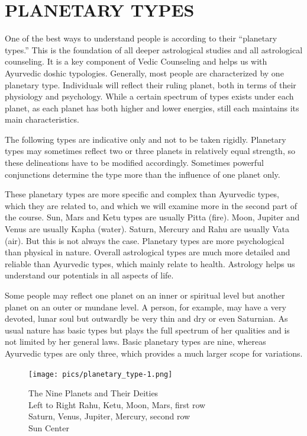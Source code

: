 \section{PLANETARY TYPES}
 

One of the best ways to understand people is according to their “planetary types.” This is the foundation of all deeper astrological studies and all astrological counseling. It is a key component of Vedic Counseling and helps us with Ayurvedic doshic typologies. Generally, most people are characterized by one planetary type. Individuals will reflect their ruling planet, both in terms of their physiology and psychology. While a certain spectrum of types exists under each planet, as each planet has both higher and lower energies, still each maintains its main characteristics.

 

The following types are indicative only and not to be taken rigidly. Planetary types may sometimes reflect two or three planets in relatively equal strength, so these delineations have to be modified accordingly. Sometimes powerful conjunctions determine the type more than the influence of one planet only.

 

These planetary types are more specific and complex than Ayurvedic types, which they are related to, and which we will examine more in the second part of the course. Sun, Mars and Ketu types are usually Pitta (fire). Moon, Jupiter and Venus are usually Kapha (water). Saturn, Mercury and Rahu are usually Vata (air). But this is not always the case. Planetary types are more psychological than physical in nature. Overall astrological types are much more detailed and reliable than Ayurvedic types, which mainly relate to health. Astrology helps us understand our potentials in all aspects of life.

 

Some people may reflect one planet on an inner or spiritual level but another planet on an outer or mundane level. A person, for example, may have a very devoted, lunar soul but outwardly be very thin and dry or even Saturnian. As usual nature has basic types but plays the full spectrum of her qualities and is not limited by her general laws. Basic planetary types are nine, whereas Ayurvedic types are only three, which provides a much larger scope for variations.

 

 \begin{figure}[H]
 \centering
\texttt{[image: pics/planetary\_type-1.png]}
\caption{ The Nine Planets and Their Deities\\
Left to Right Rahu, Ketu, Moon, Mars, first row\\
Saturn, Venus, Jupiter, Mercury, second row\\
Sun Center\\}
 \end{figure}





